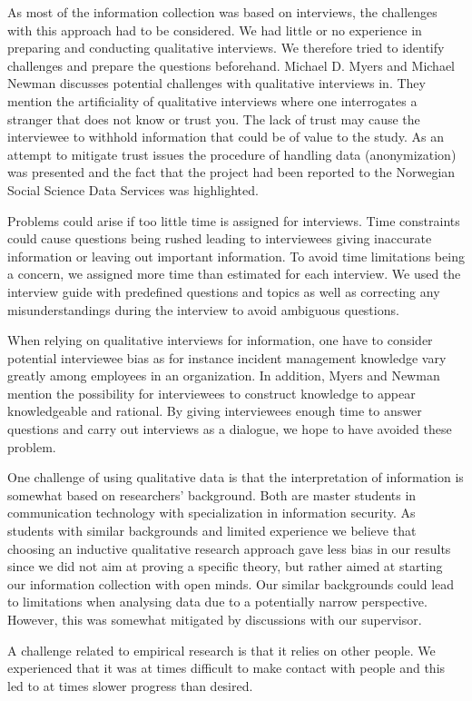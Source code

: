 As most of the information collection was based on interviews, the challenges with this approach had to be considered. We had little or no experience in preparing and conducting qualitative interviews. We therefore tried to identify challenges and prepare the questions beforehand. Michael D. Myers and Michael Newman discusses potential challenges with qualitative interviews in\cite{myers2007qualitative}. They mention the artificiality of qualitative interviews where one interrogates a stranger that does not know or trust you. The lack of trust may cause the interviewee to withhold information that could be of value to the study. As an attempt to mitigate trust issues the procedure of handling data (anonymization) was presented and the fact that the project had been reported to the Norwegian Social Science Data Services was highlighted.   

Problems could arise if too little time is assigned for interviews. Time constraints could cause questions being rushed leading to interviewees giving inaccurate information or leaving out important information. To avoid time limitations being a concern, we assigned more time than estimated for each interview. We used the interview guide with predefined questions and topics as well as correcting any misunderstandings during the interview to avoid ambiguous questions.

When relying on qualitative interviews for information, one have to consider potential interviewee bias as for instance incident management knowledge vary greatly among employees in an organization. In addition, Myers and Newman mention the possibility for interviewees to construct knowledge to appear knowledgeable and rational. By giving interviewees enough time to answer questions and carry out interviews as a dialogue, we hope to have avoided these problem.

One challenge of using qualitative data is that the interpretation of information is somewhat based on researchers' background. Both are master students in communication technology with specialization in information security. As students with similar backgrounds and limited experience we believe that choosing an inductive qualitative research approach gave less bias in our results since we did not aim at proving a specific theory, but rather aimed at starting our information collection with open minds. Our similar backgrounds could lead to limitations when analysing data due to a potentially narrow perspective. However, this was somewhat mitigated by discussions with our supervisor.

A challenge related to empirical research is that it relies on other people. We experienced that it was at times difficult to make contact with people and this led to at times slower progress than desired.


